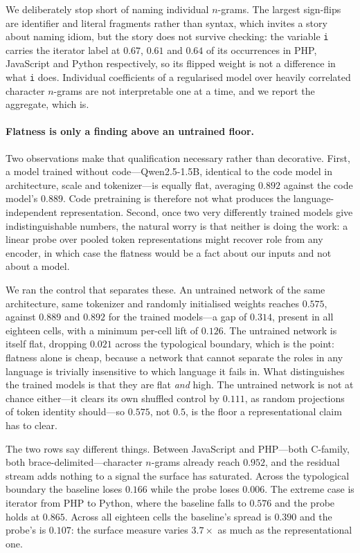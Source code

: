We deliberately stop short of naming individual $n$-grams. The largest
sign-flips are identifier and literal fragments rather than syntax, which
invites a story about naming idiom, but the story does not survive checking:
the variable \texttt{i} carries the iterator label at $0.67$, $0.61$ and
$0.64$ of its occurrences in PHP, JavaScript and Python respectively, so its
flipped weight is not a difference in what \texttt{i} does. Individual
coefficients of a regularised model over heavily correlated character
$n$-grams are not interpretable one at a time, and we report the aggregate,
which is.

\paragraph{Flatness is only a finding above an untrained floor.} Two
observations make that qualification necessary rather than decorative. First,
a model trained without code---Qwen2.5-1.5B, identical to the code model in
architecture, scale and tokenizer---is equally flat, averaging $0.892$ against
the code model's $0.889$. Code pretraining is therefore not what produces the
language-independent representation. Second, once two very differently trained
models give indistinguishable numbers, the natural worry is that neither is
doing the work: a linear probe over pooled token representations might recover
role from any encoder, in which case the flatness would be a fact about our
inputs and not about a model.

We ran the control that separates these. An untrained network of the same
architecture, same tokenizer and randomly initialised weights reaches $0.575$,
against $0.889$ and $0.892$ for the trained models---a gap of $0.314$, present
in all eighteen cells, with a minimum per-cell lift of $0.126$. The untrained
network is itself flat, dropping $0.021$ across the typological boundary, which
is the point: flatness alone is cheap, because a network that cannot separate
the roles in any language is trivially insensitive to which language it fails
in. What distinguishes the trained models is that they are flat \emph{and}
high. The untrained network is not at chance either---it clears its own
shuffled control by $0.111$, as random projections of token identity should---so
$0.575$, not $0.5$, is the floor a representational claim has to clear.

The two rows say different things. Between JavaScript and PHP---both C-family,
both brace-delimited---character $n$-grams already reach $0.952$, and the
residual stream adds nothing to a signal the surface has saturated. Across the
typological boundary the baseline loses $0.166$ while the probe loses $0.006$.
The extreme case is iterator from PHP to Python, where the baseline falls to
$0.576$ and the probe holds at $0.865$. Across all eighteen cells the
baseline's spread is $0.390$ and the probe's is $0.107$: the surface measure
varies $3.7\times$ as much as the representational one.

